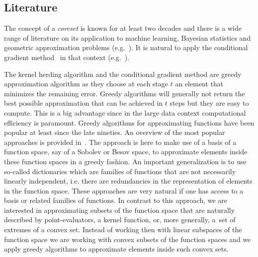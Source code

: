 \documentclass[AHL,Unicode,longabstracts,published]{cedram}
\theoremstyle{remark}
\newcounter{setofstep}
\newcounter{step}[setofstep]
\begin{document}
\subsection{Literature} \label{sec:literature}
The concept of a \emph{coreset} is known for at least two decades and there is a wide range of literature on its application to machine learning, Bayesian statistics and geometric approximation problems (e.g.~\cite{AGAR05,BAD02,HUG16}). It is natural to apply the conditional gradient method~\cite{FW56} in that context (e.g.~\cite{HUG16}).

The kernel herding algorithm and the conditional gradient method are greedy approximation algorithm as they choose at each stage $t$ an element that minimizes the remaining error. Greedy algorithms will generally not return the best possible approximation that can be achieved in $t$ steps but they are easy to compute. This is a big advantage since in the large data context computational efficiency is paramount. Greedy algorithms for approximating functions have been popular at least since the late nineties. An overview of the most popular approaches is provided in~\cite{TEMLY11}. The approach is here to make use of a basis of a function space, say of a Sobolev or Besov space, to approximate elements inside these function spaces in a greedy fashion. An important generalization is to use so-called dictionaries which are families of functions that are not necessarily linearly independent, i.e. there are redundancies in the representation of elements in the function space. These approaches are very natural if one has access to a basis or related families of functions. In contrast to this approach, we are interested in approximating subsets of the function space that are naturally described by point-evaluators, a kernel function, or, more generally, a~set of extremes of a convex set. Instead of working then with linear subspaces of the function space we are working with convex subsets of the function spaces and we apply greedy algorithms to approximate elements inside such convex sets.
\end{document}
